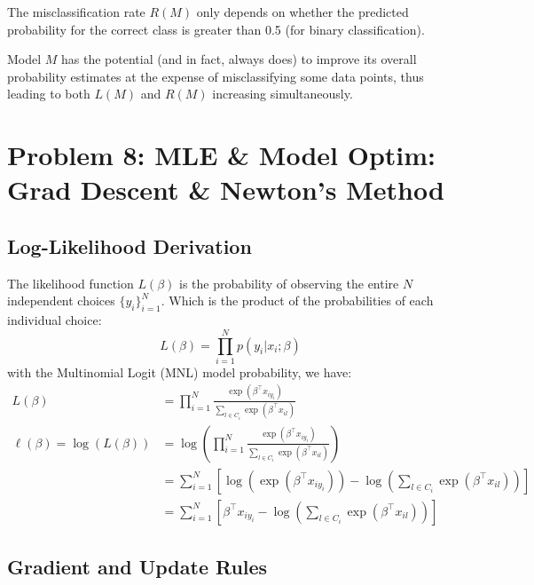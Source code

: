 \documentclass[11pt, a4paper, oneside]{memoir}
\begin{document}
The misclassification rate $R(M)$ only depends on whether the predicted probability for the correct class is greater than 0.5 (for binary classification).

Model $M$ has the potential (and in fact, always does) to improve its overall probability estimates at the expense of misclassifying some data points,
thus leading to both $L(M)$ and $R(M)$ increasing simultaneously.

\chapter{Problem 8: MLE \& Model Optim: Grad Descent \& Newton's Method}
\section{Log-Likelihood Derivation}
The likelihood function $L(\beta)$ is the probability of observing the entire $N$ independent choices $\{y_i\}_{i=1}^N$.
Which is the product of the probabilities of each individual choice:
\[ L(\beta) = \prod_{i=1}^N p(y_i | x_i; \beta) \]
with the Multinomial Logit (MNL) model probability, we have:
\begin{align*}
    L(\beta)                     & = \prod_{i=1}^{N} \frac{\exp(\beta^\top x_{iy_i})}{\sum_{l \in C_i} \exp(\beta^\top x_{il})}                                   \\
    \ell(\beta) = \log(L(\beta)) & = \log \left( \prod_{i=1}^{N} \frac{\exp(\beta^\top x_{iy_i})}{\sum_{l \in C_i} \exp(\beta^\top x_{il})} \right)               \\
                                 & = \sum_{i=1}^{N} \left[ \log(\exp(\beta^\top x_{iy_i})) - \log \left( \sum_{l \in C_i} \exp(\beta^\top x_{il}) \right) \right] \\
                                 & = \sum_{i=1}^{N} \left[ \beta^\top x_{iy_i} - \log \left( \sum_{l \in C_i} \exp(\beta^\top x_{il}) \right) \right]
\end{align*}

\section{Gradient and Update Rules}
\end{document}
